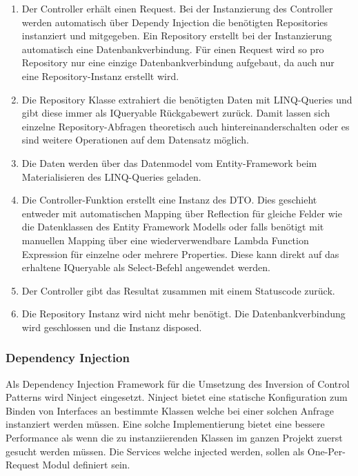 \documentclass[a4paper,10pt,xetex]{article}
\begin{document}
\begin{enumerate}
  \item
    Der Controller erh\"alt einen Request. Bei der Instanzierung des Controller werden automatisch \"uber Dependy Injection
    die ben\"otigten Repositories instanziert und mitgegeben. Ein Repository erstellt bei der Instanzierung automatisch
    eine Datenbankverbindung. F\"ur einen Request wird so pro Repository nur eine einzige Datenbankverbindung aufgebaut, da
    auch nur eine Repository-Instanz erstellt wird.
  \item
    Die Repository Klasse extrahiert die ben\"otigten Daten mit LINQ-Queries und gibt diese immer als IQueryable
    R\"uckgabewert zur\"uck. Damit lassen sich einzelne Repository-Abfragen theoretisch auch hintereinanderschalten oder es
    sind weitere Operationen auf dem Datensatz m\"oglich.
  \item
    Die Daten werden \"uber das Datenmodel vom Entity-Framework beim Materialisieren des LINQ-Queries geladen.
  \item
    Die Controller-Funktion erstellt eine Instanz des DTO. Dies geschieht entweder mit automatischen Mapping \"uber
    Reflection f\"ur gleiche Felder wie die Datenklassen des Entity Framework Modells oder falls ben\"otigt mit manuellen
    Mapping \"uber eine wiederverwendbare Lambda Function Expression f\"ur einzelne oder mehrere Properties. Diese kann
    direkt auf das erhaltene IQueryable als Select-Befehl angewendet werden.
  \item
    Der Controller gibt das Resultat zusammen mit einem Statuscode zur\"uck.
  \item
    Die Repository Instanz wird nicht mehr ben\"otigt. Die Datenbankverbindung wird geschlossen und die Instanz disposed.
\end{enumerate}

\bigskip

\subsubsection[Dependency Injection]{Dependency Injection}
  Als Dependency Injection Framework f\"ur die Umsetzung des Inversion of Control Patterns wird Ninject eingesetzt.
  Ninject bietet eine statische Konfiguration zum Binden von Interfaces an bestimmte Klassen welche bei einer solchen
  Anfrage instanziert werden m\"ussen. Eine solche Implementierung bietet eine bessere Performance als wenn die zu
  instanziierenden Klassen im ganzen Projekt zuerst gesucht werden m\"ussen. Die Services welche injected werden, sollen
  als One-Per-Request Modul definiert sein.
\end{document}
